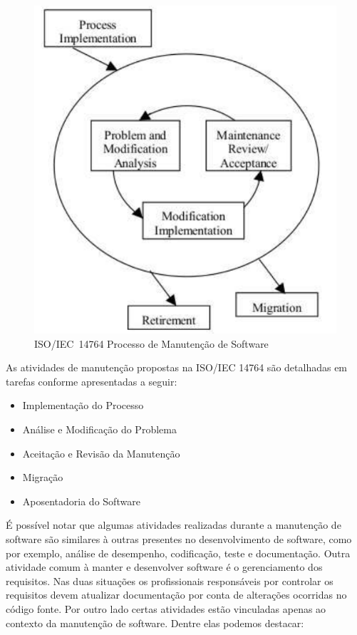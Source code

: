 \begin{figure}[htpb] \centering
	\includegraphics[width=0.7\linewidth]
{chapter-manutencao-software-visao-geral/img/ieee-14764-processo-manutencao.pdf}
	\caption{ISO/IEC~14764 Processo de Manutenção de Software}
\label{fig:ieee-14764-processo-manutencao} \end{figure}

As atividades de manutenção propostas na ISO/IEC 14764 são detalhadas em tarefas
conforme apresentadas a seguir:

\begin{itemize}
   	\item Implementação do Processo
   	\item Análise e Modificação do
		Problema 
	\item Aceitação e Revisão da Manutenção
   	\item Migração
   	\item Aposentadoria do Software
\end{itemize}

É possível notar que algumas atividades realizadas durante a manutenção de
software são similares à outras presentes no desenvolvimento de software, como
por exemplo, análise de desempenho, codificação, teste e documentação. Outra
atividade comum à manter e desenvolver software é o gerenciamento dos
requisitos. Nas duas situações os profissionais responsáveis por controlar os
requisitos devem atualizar do\-cu\-men\-ta\-ção  por conta de alterações
ocorridas no código fonte. Por outro lado certas atividades estão vinculadas
apenas ao contexto da manutenção de software. Dentre elas podemos destacar:

